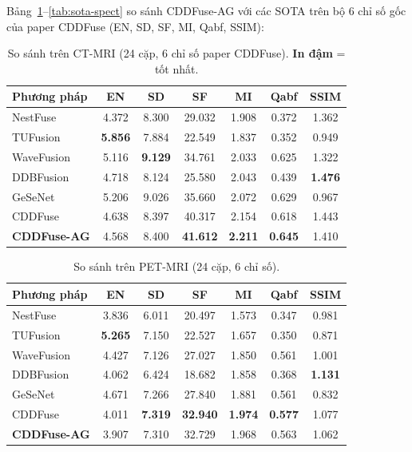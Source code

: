 \documentclass[12pt,a4paper]{article}
\begin{document}
Bảng~\ref{tab:sota-ct}--\ref{tab:sota-spect} so sánh CDDFuse-AG với các SOTA
trên bộ 6 chỉ số gốc của paper CDDFuse (EN, SD, SF, MI, Qabf, SSIM):

\begin{table}[H]
\centering
\caption{So sánh trên CT-MRI (24 cặp, 6 chỉ số paper CDDFuse). \textbf{In đậm}
= tốt nhất.}
\label{tab:sota-ct}
\small
\setlength{\tabcolsep}{4pt}
\begin{tabular}{lcccccc}
\toprule
\textbf{Phương pháp} & \textbf{EN} & \textbf{SD} & \textbf{SF} & \textbf{MI} & \textbf{Qabf} & \textbf{SSIM} \\
\midrule
NestFuse~\cite{li2020nestfuse}    & 4.372 & 8.300 & 29.032 & 1.908 & 0.372 & 1.362 \\
TUFusion~\cite{zhao2024tufusion}  & \textbf{5.856} & 7.884 & 22.549 & 1.837 & 0.352 & 0.949 \\
WaveFusion~\cite{wang2025wavefusion}& 5.116 & \textbf{9.129} & 34.761 & 2.033 & 0.625 & 1.322 \\
DDBFusion~\cite{zhang2025ddbfusion} & 4.718 & 8.124 & 25.580 & 2.043 & 0.439 & \textbf{1.476} \\
GeSeNet~\cite{li2023gesenet}      & 5.206 & 9.026 & 35.660 & 2.072 & 0.629 & 0.967 \\
CDDFuse~\cite{zhao2023cddfuse}    & 4.638 & 8.397 & 40.317 & 2.154 & 0.618 & 1.443 \\
\midrule
\textbf{CDDFuse-AG}               & 4.568 & 8.400 & \textbf{41.612} & \textbf{2.211} & \textbf{0.645} & 1.410 \\
\bottomrule
\end{tabular}
\end{table}

\begin{table}[H]
\centering
\caption{So sánh trên PET-MRI (24 cặp, 6 chỉ số).}
\label{tab:sota-pet}
\small
\setlength{\tabcolsep}{4pt}
\begin{tabular}{lcccccc}
\toprule
\textbf{Phương pháp} & \textbf{EN} & \textbf{SD} & \textbf{SF} & \textbf{MI} & \textbf{Qabf} & \textbf{SSIM} \\
\midrule
NestFuse   & 3.836 & 6.011 & 20.497 & 1.573 & 0.347 & 0.981 \\
TUFusion   & \textbf{5.265} & 7.150 & 22.527 & 1.657 & 0.350 & 0.871 \\
WaveFusion & 4.427 & 7.126 & 27.027 & 1.850 & 0.561 & 1.001 \\
DDBFusion  & 4.062 & 6.424 & 18.682 & 1.858 & 0.368 & \textbf{1.131} \\
GeSeNet    & 4.671 & 7.266 & 27.840 & 1.881 & 0.561 & 0.832 \\
CDDFuse    & 4.011 & \textbf{7.319} & \textbf{32.940} & \textbf{1.974} & \textbf{0.577} & 1.077 \\
\midrule
\textbf{CDDFuse-AG} & 3.907 & 7.310 & 32.729 & 1.968 & 0.563 & 1.062 \\
\bottomrule
\end{tabular}
\end{table}
\end{document}

